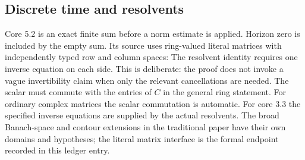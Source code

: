 \subsection{Discrete time and resolvents}
Core 5.2 is an exact finite sum before a norm estimate is applied. Horizon zero is included by the empty sum. Its source uses ring-valued literal matrices with independently typed row and column spaces:
The resolvent identity requires one inverse equation on each side. This is deliberate: the proof does not invoke a vague invertibility claim when only the relevant cancellations are needed. The scalar must commute with the entries of $C$ in the general ring statement.
For ordinary complex matrices the scalar commutation is automatic. For core 3.3 the specified inverse equations are supplied by the actual resolvents. The broad Banach-space and contour extensions in the traditional paper have their own domains and hypotheses; the literal matrix interface is the formal endpoint recorded in this ledger entry.
